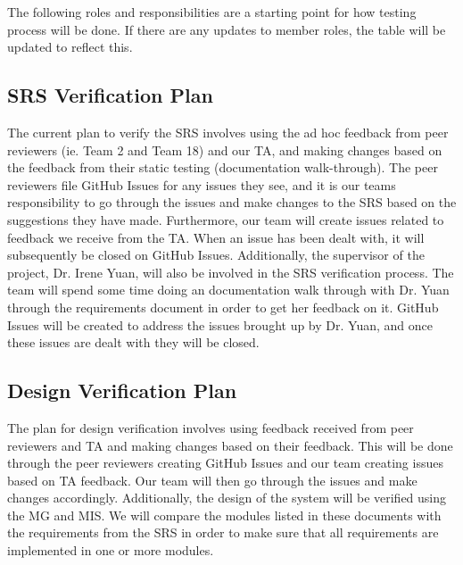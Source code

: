 \documentclass[12pt, titlepage]{article}
\begin{document}
The following roles and responsibilities are a starting point for how testing process will be done. If there are any updates to member roles, the table will be updated to reflect this.

\subsection{SRS Verification Plan} \label{SRSVerification}


The current plan to verify the SRS involves using the ad hoc feedback from peer reviewers (ie. Team 2 and Team 18) and our TA, and making changes based on
the feedback from their static testing (documentation walk-through). The peer reviewers file GitHub Issues for any issues they see, and it is our teams responsibility to go through the issues and make changes to the SRS based on the suggestions they have made. Furthermore, our team will create issues related to feedback we receive from the TA. When an issue has been dealt with, it will subsequently be closed on GitHub Issues. Additionally, the supervisor of the project, Dr. Irene Yuan, will also be involved in the SRS verification process. The team will spend some time doing an documentation walk through with Dr. Yuan through the requirements document in order to get her feedback on it. GitHub Issues will be created to address the issues brought up by Dr. Yuan, and once these issues are dealt with they will be closed.

\subsection{Design Verification Plan}



The plan for design verification involves using feedback received from peer reviewers and TA and making changes based on their feedback. This will be done through the peer reviewers creating GitHub Issues and our team creating issues based on TA feedback. Our team will then go through the issues and make changes accordingly. Additionally, the design of the system will be verified using the MG and MIS. We will compare the modules listed in these documents with the requirements from the SRS in order to make sure that all requirements are implemented in one or more modules. 
\end{document}
